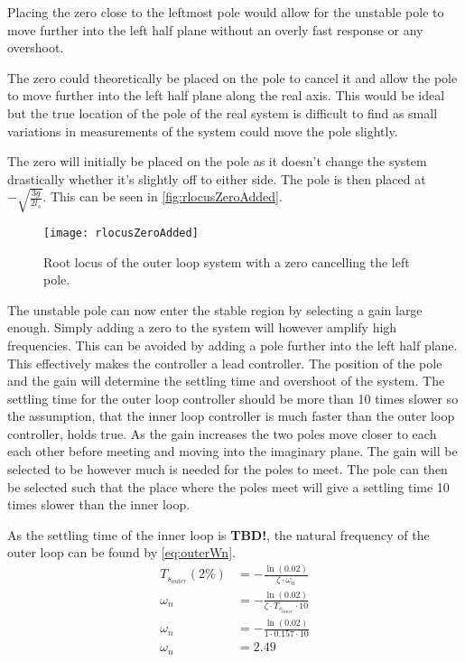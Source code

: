 Placing the zero close to the leftmost pole would allow for the unstable pole to move further into the left half plane without an overly fast response or any overshoot. 

The zero could theoretically be placed on the pole to cancel it and allow the pole to move further into the left half plane along the real axis. This would be ideal but the true location of the pole of the real system is difficult to find as small variations in measurements of the system could move the pole slightly. 

The zero will initially be placed on the pole as it doesn't change the system drastically whether it's slightly off to either side. The pole is then placed at $-\sqrt{\frac{3g}{2l_s}}$. This can be seen in \autoref{fig:rlocusZeroAdded}.

\begin{figure}[htbp]
\centering
\texttt{[image: rlocusZeroAdded]}
\caption{Root locus of the outer loop system with a zero cancelling the left pole.}
\label{fig:rlocusZeroAdded}
\end{figure}

The unstable pole can now enter the stable region by selecting a gain large enough. Simply adding a zero to the system will however amplify high frequencies. This can be avoided by adding a pole further into the left half plane. This effectively makes the controller a lead controller. The position of the pole and the gain will determine the settling time and overshoot of the system. The settling time for the outer loop controller should be more than 10 times slower so the assumption, that the inner loop controller is much faster than the outer loop controller, holds true. As the gain increases the two poles move closer to each each other before meeting and moving into the imaginary plane. The gain will be selected to be however much is needed for the poles to meet. The pole can then be selected such that the place where the poles meet will give a settling time 10 times slower than the inner loop.

As the settling time of the inner loop is \textbf{TBD!}, the natural frequency of the outer loop can be found by \autoref{eq:outerWn}. 
\begin{subequations} \label{eq:outerWn}
\begin{flalign}
T_{s_{outer}}(2\%) &=-\frac{\ln(0.02)}{\zeta\cdot \omega_n} \\
\omega_n &=-\frac{\ln(0.02)}{\zeta\cdot T_{s_{inner}}\cdot 10} \\
\omega_n &=-\frac{\ln(0.02)}{1\cdot 0.157 \cdot 10} \\
\omega_n &=2.49
\end{flalign}
\end{subequations}

